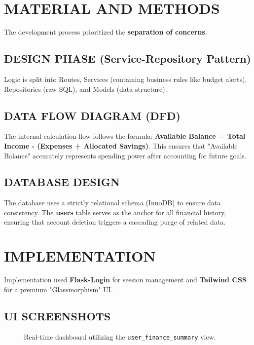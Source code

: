 \documentclass[12pt,a4paper]{article}
\begin{document}
\newpage

\section{MATERIAL AND METHODS}
The development process prioritized the \textbf{separation of concerns}.

\subsection{DESIGN PHASE (Service-Repository Pattern)}
Logic is split into Routes, Services (containing business rules like budget alerts), Repositories (raw SQL), and Models (data structure).

\subsection{DATA FLOW DIAGRAM (DFD)}
The internal calculation flow follows the formula: \textbf{Available Balance = Total Income - (Expenses + Allocated Savings)}. This ensures that "Available Balance" accurately represents spending power after accounting for future goals.

\subsection{DATABASE DESIGN}
The database uses a strictly relational schema (InnoDB) to ensure data consistency. The \textbf{users} table serves as the anchor for all financial history, ensuring that account deletion triggers a cascading purge of related data.

\newpage

\section{IMPLEMENTATION}
Implementation used \textbf{Flask-Login} for session management and \textbf{Tailwind CSS} for a premium "Glassmorphism" UI.

\subsection{UI SCREENSHOTS}
\begin{figure}[H]
    \centering
    \caption{Real-time dashboard utilizing the \texttt{user\_finance\_summary} view.}
\end{figure}
\end{document}
